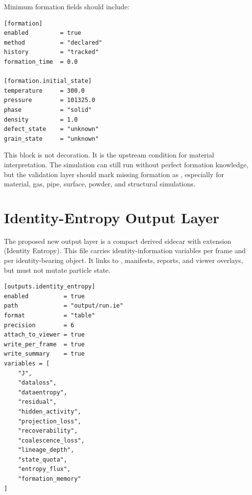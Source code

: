 \documentclass[11pt,a4paper]{article}
\begin{document}
Minimum formation fields should include:

\begin{tomlframe}
\begin{lstlisting}[style=tomlstyle]
[formation]
enabled         = true
method          = "declared"
history         = "tracked"
formation_time  = 0.0

[formation.initial_state]
temperature     = 300.0
pressure        = 101325.0
phase           = "solid"
density         = 1.0
defect_state    = "unknown"
grain_state     = "unknown"
\end{lstlisting}
\end{tomlframe}

This block is not decoration. It is the upstream condition for material interpretation.
The simulation can still run without perfect formation knowledge, but the validation layer
should mark missing formation as , especially for material, gas, pipe,
surface, powder, and structural simulations.

\section{Identity-Entropy Output Layer}

The proposed new output layer is a compact derived sidecar with extension 
(Identity Entropy). This file carries identity-information variables per frame and per
identity-bearing object. It links to , manifests, reports, and viewer overlays,
but must not mutate particle state.

\begin{tomlframe}
\begin{lstlisting}[style=tomlstyle]
[outputs.identity_entropy]
enabled          = true
path             = "output/run.ie"
format           = "table"
precision        = 6
attach_to_viewer = true
write_per_frame  = true
write_summary    = true
variables = [
    "J",
    "dataloss",
    "dataentropy",
    "residual",
    "hidden_activity",
    "projection_loss",
    "recoverability",
    "coalescence_loss",
    "lineage_depth",
    "state_quota",
    "entropy_flux",
    "formation_memory"
]
\end{lstlisting}
\end{tomlframe}
\end{document}
